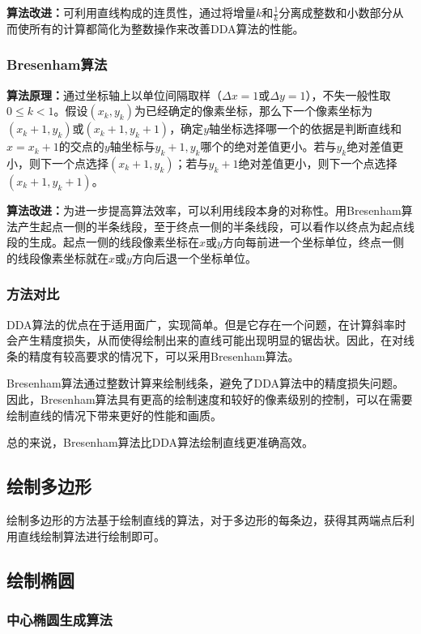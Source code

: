 \documentclass[a4paper,UTF8]{article}
\theoremstyle{definition}
\begin{document}
\textbf{算法改进：}可利用直线构成的连贯性，通过将增量$k$和$\frac{1}{k}$分离成整数和小数部分从而使所有的计算都简化为整数操作来改善DDA算法的性能。

\subsubsection{Bresenham算法}

\textbf{算法原理：}通过坐标轴上以单位间隔取样（$\Delta x = 1$或$\Delta y = 1$），不失一般性取$0\leq k<1$。假设$(x_k,y_k)$为已经确定的像素坐标，那么下一个像素坐标为$(x_{k}+1,y_k)$或$(x_k+1,y_k+1)$，确定$y$轴坐标选择哪一个的依据是判断直线和$x=x_k+1$的交点的$y$轴坐标与$y_k+1,y_k$哪个的绝对差值更小。若与$y_k$绝对差值更小，则下一个点选择$(x_k+1,y_k)$；若与$y_k+1$绝对差值更小，则下一个点选择$(x_k+1,y_k+1)$。

\textbf{算法改进：}为进一步提高算法效率，可以利用线段本身的对称性。用Bresenham算法产生起点一侧的半条线段，至于终点一侧的半条线段，可以看作以终点为起点线段的生成。起点一侧的线段像素坐标在$x$或$y$方向每前进一个坐标单位，终点一侧的线段像素坐标就在$x$或$y$方向后退一个坐标单位。

\subsubsection{方法对比}

DDA算法的优点在于适用面广，实现简单。但是它存在一个问题，在计算斜率时会产生精度损失，从而使得绘制出来的直线可能出现明显的锯齿状。因此，在对线条的精度有较高要求的情况下，可以采用Bresenham算法。

Bresenham算法通过整数计算来绘制线条，避免了DDA算法中的精度损失问题。因此，Bresenham算法具有更高的绘制速度和较好的像素级别的控制，可以在需要绘制直线的情况下带来更好的性能和画质。

总的来说，Bresenham算法比DDA算法绘制直线更准确高效。

\subsection{绘制多边形}

绘制多边形的方法基于绘制直线的算法，对于多边形的每条边，获得其两端点后利用直线绘制算法进行绘制即可。

\subsection{绘制椭圆}

\subsubsection{中心椭圆生成算法}
\end{document}
